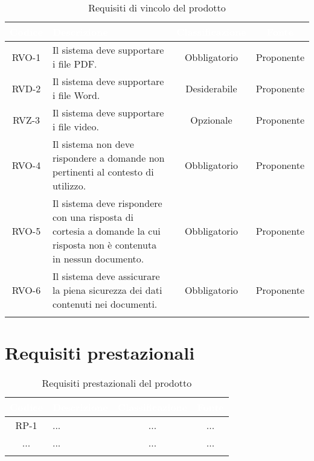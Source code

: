 \begingroup
\setlength{\tabcolsep}{10pt}
\renewcommand{\arraystretch}{1.5}
\begin{xltabular}{\textwidth}{| c | X | c | c |}
    \hline
     \textbf{\textcolor{white}{Codice}} & \textbf{\textcolor{white}{Descrizione}} & \textbf{\textcolor{white}{Classificazione}} & \textbf{\textcolor{white}{Fonte}}\\
    \hline
    \endhead
    RVO-1 & Il sistema deve supportare i file PDF. & Obbligatorio & Proponente \\
    \hline
    RVD-2 & Il sistema deve supportare i file Word. & Desiderabile & Proponente \\
    \hline
    RVZ-3 & Il sistema deve supportare i file video. & Opzionale & Proponente \\
    \hline
    RVO-4 & Il sistema non deve rispondere a domande non pertinenti al contesto di utilizzo. & Obbligatorio & Proponente \\
    \hline
    RVO-5 & Il sistema deve rispondere con una risposta di cortesia a domande la cui risposta non è contenuta in nessun documento. & Obbligatorio & Proponente \\
    \hline
    RVO-6 & Il sistema deve assicurare la piena sicurezza dei dati contenuti nei documenti. & Obbligatorio & Proponente \\
    \hline
     \caption{Requisiti di vincolo del prodotto}
    \label{tab:reqvin}
\end{xltabular}
\endgroup

\section{Requisiti prestazionali}

\begingroup
\setlength{\tabcolsep}{10pt}
\renewcommand{\arraystretch}{1.5}
\begin{xltabular}{\textwidth}{| c | X | c | c |}
    \hline
     \textbf{\textcolor{white}{Codice}} & \textbf{\textcolor{white}{Descrizione}} & \textbf{\textcolor{white}{Classificazione}} & \textbf{\textcolor{white}{Fonte}}\\
    \hline
    \endhead
    RP-1 & ... & ... & ... \\
    \hline
    ... & ... & ... & ... \\
    \hline
     \caption{Requisiti prestazionali del prodotto}
    \label{tab:reqpre}
\end{xltabular}
\endgroup

